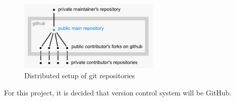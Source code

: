 \begin{figure}[htb]
	\centering
	\includegraphics[width=0.6\textwidth]{prestudy/github.jpg}
	\caption{Distributed setup of git repositories\cite{git:repositories}}
	\label{fig:github}
\end{figure}

For this project, it is decided that version control system will be GitHub.
